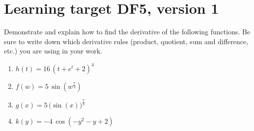 \section{Learning target DF5, version 1}
\providecommand{\stxKnowl}{}\renewcommand{\stxKnowl}[1]{#1}
\providecommand{\stxOuttro}{}\renewcommand{\stxOuttro}[1]{#1}
\providecommand{\stxTitle}{}\renewcommand{\stxTitle}[1]{#1}
\renewcommand{\stxOuttro}[1]{}
\stxKnowl{
 Demonstrate and explain how to find the derivative of the following functions. Be sure to write down which derivative rules (product, quotient, sum and difference, etc.) you are using in your work. 

\begin{enumerate}
\item
\stxKnowl{
\(h(t)= 16 \, {\left(t + e^{t} + 2\right)}^{4}\)

\stxOuttro{
\[h' (t)= 64 \, {\left(t + e^{t} + 2\right)}^{3} {\left(e^{t} + 1\right)}\]

}
}
\vfill
\item
\stxKnowl{
\(f(w)= 5 \, \sin\left(w^{\frac{7}{3}}\right)\)

\stxOuttro{
\[f' (w)= \frac{35}{3} \, w^{\frac{4}{3}} \cos\left(w^{\frac{7}{3}}\right)\]

}
}
\vfill
\item
\stxKnowl{
\(g(x)= 5 \, \Big(\sin\left(x\right)\Big)^{\frac{7}{3}}\)

\stxOuttro{
\[g' (x)= \frac{35}{3} \, \cos\left(x\right) \sin\left(x\right)^{\frac{4}{3}}\]

}
}
\vfill
\item
\stxKnowl{
\(k(y)= -4 \, \cos\left(-y^{2} - y + 2\right)\)

\stxOuttro{
\[k' (y)= -4 \, {\left(2 \, y + 1\right)} \sin\left(-y^{2} - y + 2\right)\]

}
}
\vfill
\end{enumerate}
}

\pagebreak

